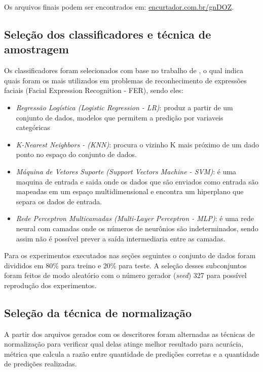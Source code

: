  Os arquivos finais podem ser encontrados em: \url{encurtador.com.br/gnDOZ}.

\subsection{Seleção dos classificadores e técnica de amostragem}
Os classificadores foram selecionados com base no trabalho de \cite{rajan:19}, o qual indica quais foram os mais utilizados em problemas de reconhecimento de expressões faciais (Facial Expression Recognition - FER), sendo eles:
\begin{itemize}
	\item \textit{Regressão Logística (Logistic Regression - LR)}: produz a partir de um conjunto de dados, modelos que permitem a predição por variaveis categóricas
	\item \textit{ K-Nearest Neighbors - (KNN)}: procura o vizinho K mais próximo de um dado ponto no espaço do conjunto de dados.
	\item \textit{Máquina de Vetores Suporte (Support Vectors Machine - SVM)}: é uma maquina de entrada e saida onde os dados que são enviados como entrada são mapeadas em um espaço multidimensional e encontra um hiperplano que separa os dados de entrada.
	\item \textit{Rede Perceptron Multicamadas (Multi-Layer Perceptron - MLP)}: é uma rede neural com camadas onde os números de neurônios são indeterminados, sendo assim não é possível prever a saída intermediaria entre as camadas.
	
\end{itemize}

 Para os experimentos executados nas seções seguintes o conjunto de dados foram divididos em 80\% para treino e 20\% para teste. A seleção desses subconjuntos foram feitos de modo aleatório com o número gerador  (\textit{seed}) 327 para possível reprodução dos experimentos.

\subsection{Seleção da técnica de normalização}

A partir dos arquivos gerados com os descritores foram alternadas as técnicas de normalização para verificar qual delas atinge melhor resultado para acurácia, métrica que calcula a razão entre quantidade de predições corretas e a quantidade de predições realizadas. 

